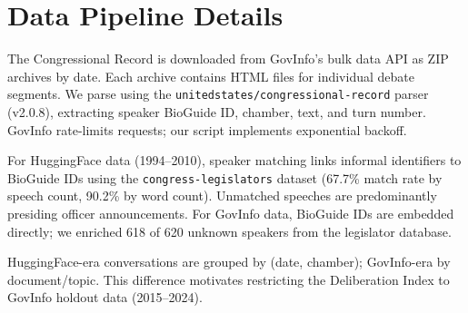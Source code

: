 \documentclass[12pt]{article}
\begin{document}
\section{Data Pipeline Details}
\label{app:data}

The Congressional Record is downloaded from GovInfo's bulk data API as ZIP archives by date. Each archive contains HTML files for individual debate segments. We parse using the \texttt{unitedstates/congressional-record} parser (v2.0.8), extracting speaker BioGuide ID, chamber, text, and turn number. GovInfo rate-limits requests; our script implements exponential backoff.

For HuggingFace data (1994--2010), speaker matching links informal identifiers to BioGuide IDs using the \texttt{congress-legislators} dataset (67.7\% match rate by speech count, 90.2\% by word count). Unmatched speeches are predominantly presiding officer announcements. For GovInfo data, BioGuide IDs are embedded directly; we enriched 618 of 620 unknown speakers from the legislator database.

HuggingFace-era conversations are grouped by (date, chamber); GovInfo-era by document/topic. This difference motivates restricting the Deliberation Index to GovInfo holdout data (2015--2024).
\end{document}
